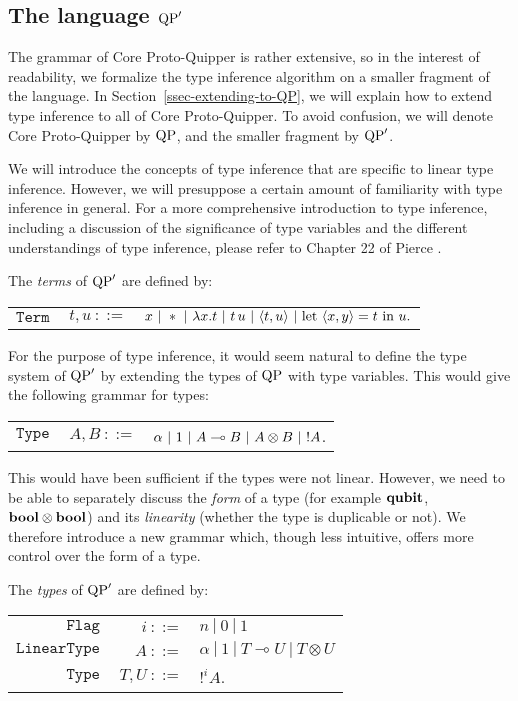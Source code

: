 
\subsection{The language ${\rm QP}'$}

The grammar of Core Proto-Quipper is rather extensive, so in the interest of readability, we formalize the type inference algorithm on a smaller fragment of the language. In Section~\ref{ssec-extending-to-QP}, we will explain how to extend type inference to all of Core Proto-Quipper. To avoid confusion, we will denote Core Proto-Quipper by ${\rm QP}$, and the smaller fragment by ${\rm QP}'$.

We will introduce the concepts of type inference that are specific to
linear type inference. However, we will presuppose a certain amount of
familiarity with type inference in general.  For a more comprehensive
introduction to type inference, including a discussion of the
significance of type variables and the different understandings of
type inference, please refer to Chapter 22 of Pierce {\cite{pierce02}}.

\begin{defn} The \emph{terms} of ${\rm QP}'$ are defined by:
	\begin{center}
	\begin{tabular}{rrl}
		$\texttt{Term}$&$ ~t,u~ ::=$ & $x ~|~ * ~|~ \lambda x.t ~|~ t \, u ~|~ \langle t, u \rangle ~|~ \text{let}~ \langle x, y \rangle = t ~\text{in}~ u. $
	\end{tabular}
	\end{center}
\end{defn}

For the purpose of type inference, it would seem natural to define the type system of ${\rm QP}'$ by extending the types of ${\rm QP}$ with type variables. This would give the following grammar for types:
	\begin{center}
	\begin{tabular}{rrl}
		$\texttt{Type}$&$ ~A,B~ ::=$ & $\alpha ~|~ 1 ~|~ A \multimap B ~|~ A \otimes B ~|~ {!} A$.
	\end{tabular}
	\end{center}
This would have been sufficient if the types were not linear. However, we need to be able to separately discuss the \textit{form} of a type (for example $\textrm{\bf qubit}$, $\textrm{\bf bool} \otimes \textrm{\bf bool}$) and its \textit{linearity} (whether the type is duplicable or not). We therefore introduce a new grammar which, though less intuitive, offers more control over the form of a type.

\begin{defn} The \emph{types} of ${\rm QP}'$ are defined by:
	\begin{center}
	\begin{tabular}{rrl}
		$\texttt{Flag}$&$~i~ ::=$ & $n ~|~ 0 ~|~ 1$ \\		
		$\texttt{LinearType}$&$ ~A~ ::=$ & $\alpha ~|~ 1 ~|~ T \multimap U ~|~ T \otimes U$ \\
		$\texttt{Type}$&$ ~T,U~ ::=$ & $!^i A$.
	\end{tabular}
	\end{center}
\end{defn}

